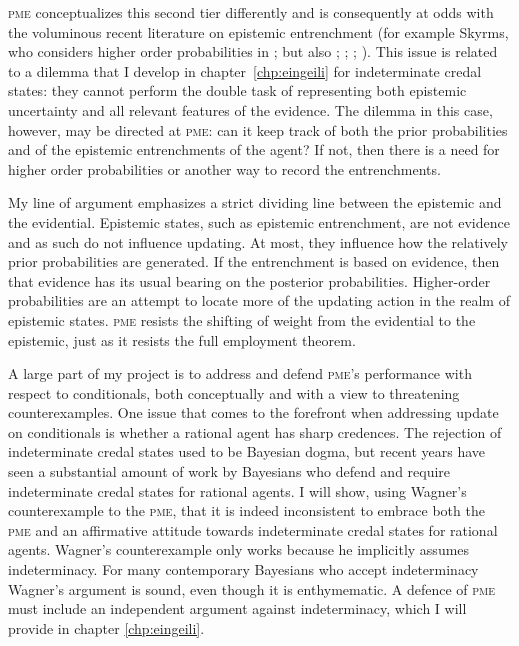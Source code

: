 \documentclass[phd,12pt,oneside]{ubcthesis}
\begin{document}
\textsc{pme} conceptualizes this second tier differently and is
consequently at odds with the voluminous recent literature on
epistemic entrenchment (for example Skyrms, who considers higher order
probabilities in ; but also
; ;
; ). This issue is
related to a dilemma that I develop in chapter~\ref{chp:eingeili} for
indeterminate credal states: they cannot perform the double task of
representing both epistemic uncertainty and all relevant features of
the evidence. The dilemma in this case, however, may be directed at
\textsc{pme}: can it keep track of both the prior probabilities and of
the epistemic entrenchments of the agent? If not, then there is a need
for higher order probabilities or another way to record the
entrenchments. 

My line of argument emphasizes a strict dividing line between the
epistemic and the evidential. Epistemic states, such as epistemic
entrenchment, are not evidence and as such do not influence updating.
At most, they influence how the relatively prior probabilities are
generated. If the entrenchment is based on evidence, then that
evidence has its usual bearing on the posterior probabilities.
Higher-order probabilities are an attempt to locate more of the
updating action in the realm of epistemic states. \textsc{pme} resists
the shifting of weight from the evidential to the epistemic, just as
it resists the full employment theorem.

A large part of my project is to address and defend \textsc{pme}'s
performance with respect to conditionals, both conceptually and with a
view to threatening counterexamples. One issue that comes to the
forefront when addressing update on conditionals is whether a rational
agent has sharp credences. The rejection of indeterminate credal
states used to be Bayesian dogma, but recent years have seen a
substantial amount of work by Bayesians who defend and require
indeterminate credal states for rational agents. I will show, using
Wagner's counterexample to the \textsc{pme}, that it is indeed
inconsistent to embrace both the \textsc{pme} and an affirmative
attitude towards indeterminate credal states for rational agents.
Wagner's counterexample only works because he implicitly assumes
indeterminacy. For many contemporary Bayesians who accept
indeterminacy Wagner's argument is sound, even though it is
enthymematic. A defence of \textsc{pme} must include an independent
argument against indeterminacy, which I will provide in chapter
\ref{chp:eingeili}.
\end{document}
